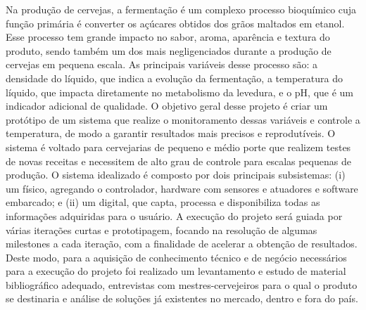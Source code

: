 Na produção de cervejas, a fermentação é um complexo processo bioquímico cuja função primária é converter os açúcares obtidos dos grãos maltados em etanol. Esse processo tem grande impacto no sabor, aroma, aparência e textura do produto, sendo também um dos mais negligenciados durante a produção de cervejas em pequena escala. 
As principais variáveis desse processo são: a densidade do líquido, que indica a evolução da fermentação, a temperatura do líquido, que impacta diretamente no metabolismo da levedura, e o pH, que é um indicador adicional de qualidade. 
O objetivo geral desse projeto é criar um protótipo de um sistema que realize o monitoramento dessas variáveis e controle a temperatura, de modo a garantir resultados mais precisos e reprodutíveis. O sistema é voltado para cervejarias de pequeno e médio porte que realizem testes de novas receitas e necessitem de alto grau de controle para escalas pequenas de produção. 
O sistema idealizado é composto por dois principais subsistemas: (i) um físico, agregando o controlador, hardware com sensores e atuadores e software embarcado; e (ii) um digital, que capta, processa e disponibiliza todas as informações adquiridas para o usuário. A execução do projeto será guiada por várias iterações curtas e prototipagem, focando na resolução de algumas milestones a cada iteração, com a finalidade de acelerar a obtenção de resultados.
Deste modo, para a aquisição de conhecimento técnico e de negócio necessários para a execução do projeto foi realizado um levantamento e estudo de material bibliográfico adequado, entrevistas com mestres-cervejeiros para o qual o produto se destinaria e análise de soluções já existentes no mercado, dentro e fora do país.
